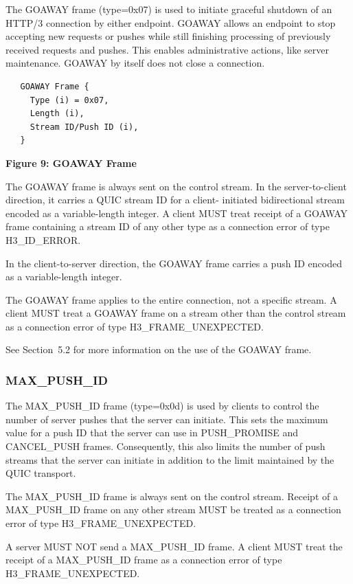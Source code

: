 \documentclass{article}
\begin{document}
The GOAWAY frame (type=0x07) is used to initiate graceful shutdown of an HTTP/3 connection by either endpoint.  GOAWAY allows an endpoint to stop accepting new requests or pushes while still finishing processing of previously received requests and pushes.  This enables administrative actions, like server maintenance.  GOAWAY by itself does not close a connection.

\begin{verbatim}
   GOAWAY Frame {
     Type (i) = 0x07,
     Length (i),
     Stream ID/Push ID (i),
   }
\end{verbatim}

\begin{center}
\textbf{Figure 9: GOAWAY Frame}
\end{center}

The GOAWAY frame is always sent on the control stream.  In the server-to-client direction, it carries a QUIC stream ID for a client- initiated bidirectional stream encoded as a variable-length integer. A client MUST treat receipt of a GOAWAY frame containing a stream ID of any other type as a connection error of type H3\_ID\_ERROR.

In the client-to-server direction, the GOAWAY frame carries a push ID encoded as a variable-length integer.

The GOAWAY frame applies to the entire connection, not a specific stream.  A client MUST treat a GOAWAY frame on a stream other than the control stream as a connection error of type H3\_FRAME\_UNEXPECTED.

See Section~5.2 for more information on the use of the GOAWAY frame.

\subsubsection{MAX\_PUSH\_ID}

The MAX\_PUSH\_ID frame (type=0x0d) is used by clients to control the number of server pushes that the server can initiate.  This sets the maximum value for a push ID that the server can use in PUSH\_PROMISE and CANCEL\_PUSH frames.  Consequently, this also limits the number of push streams that the server can initiate in addition to the limit maintained by the QUIC transport.

The MAX\_PUSH\_ID frame is always sent on the control stream.  Receipt of a MAX\_PUSH\_ID frame on any other stream MUST be treated as a connection error of type H3\_FRAME\_UNEXPECTED.

A server MUST NOT send a MAX\_PUSH\_ID frame.  A client MUST treat the receipt of a MAX\_PUSH\_ID frame as a connection error of type H3\_FRAME\_UNEXPECTED.
\end{document}
